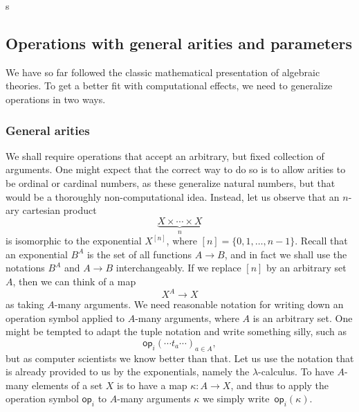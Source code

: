 s\documentclass{amsart}
\newcommand{\set}[1]{\{#1\}} %
\newcommand{\op}[1]{\mathsf{op}_{#1}} %
\begin{document}
\subsection{Operations with general arities and parameters}
\label{sec:oper-gener-arit-param}

We have so far followed the classic mathematical presentation of algebraic
theories. To get a better fit with computational effects, we need to generalize
operations in two ways.

\subsubsection{General arities}
\label{sec:general-arities}

We shall require operations that accept an arbitrary, but fixed collection of
arguments. One might expect that the correct way to do so is to allow arities to
be ordinal or cardinal numbers, as these generalize natural numbers, but that
would be a thoroughly non-computational idea. Instead, let us observe that an
$n$-ary cartesian product
%
\begin{equation*}
  \underbrace{X \times \cdots \times X}_{n}
\end{equation*}
%
is isomorphic to the exponential $X^{[n]}$, where
$[n] = \set{0, 1, \ldots, n-1}$. Recall that an exponential $B^A$ is the set of
all functions $A \to B$, and in fact we shall use the notations $B^A$ and
$A \to B$ interchangeably. If we replace $[n]$ by an arbitrary set~$A$, then we
can think of a map
%
\begin{equation*}
  X^A \to X
\end{equation*}
%
as taking $A$-many arguments. We need reasonable notation for writing down an
operation symbol applied to $A$-many arguments, where $A$ is an arbitrary set. One
might be tempted to adapt the tuple notation and write something silly, such as
%
\begin{equation*}
  \op{i}(\cdots t_a \cdots)_{a \in A},
\end{equation*}
%
but as computer scientists we know better than that. Let us use the notation that
is already provided to us by the exponentials, namely the $\lambda$-calculus. To
have $A$-many elements of a set $X$ is to have a map $\kappa : A \to X$, and
thus to apply the operation symbol $\op{i}$ to $A$-many arguments $\kappa$ we
simply write~$\op{i}(\kappa)$.
\end{document}
